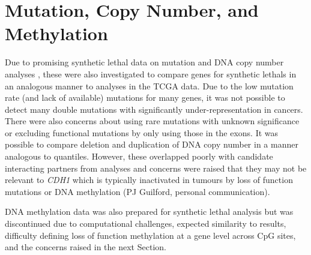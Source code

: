 
\FloatBarrier


\iffalse

\section{Mutation, Copy Number, and Methylation}

Due to promising \gls{synthetic lethal} data on \gls{mutation} and \acrshort{DNA} copy number analyses \citep{Jerby2014, Lu2015}, these were also investigated to compare genes for \glspl{synthetic lethal} in an analogous manner to  analyses in the \gls{TCGA} data. Due to the low  \gls{mutation} rate (and lack of available)  \glspl{mutation} for many genes, it was not possible to detect many double \glspl{mutation} with significantly under-representation in cancers. There were also concerns about using rare \glspl{mutation} with unknown significance or excluding functional \glspl{mutation} by only using those in the exons.
It was possible to compare deletion and duplication of \acrshort{DNA} copy number in a manner analogous to  quantiles. However, these overlapped poorly with candidate interacting partners from  analyses and concerns were raised that they may not be relevant to \textit{CDH1} which is typically inactivated in tumours by loss of function \glspl{mutation} or \acrshort{DNA} methylation (PJ Guilford, personal communication).   

DNA methylation data was also prepared for \gls{synthetic lethal} analysis but was discontinued due to computational challenges, expected similarity to  results, difficulty defining loss of function methylation at a gene level across CpG sites, and the concerns raised in the next Section. 

